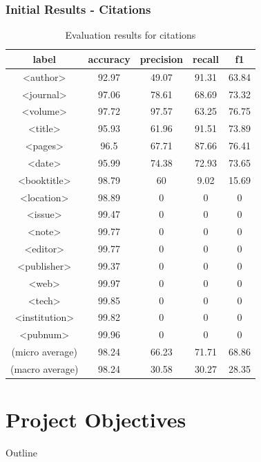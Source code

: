 \documentclass{beamer}
\begin{document}

\begin{frame}
\frametitle{Initial Results - Citations}

\begin{center}
\begingroup
\fontsize{8pt}{10pt}\selectfont

\begin{table}[h]
\begin{tabular}{ccccc}
\hline
label & accuracy & precision & recall & f1 \\
\hline
<author>	&92.97&49.07&91.31&63.84 \\
<journal>	&	97.06&		78.61	&	68.69	&	73.32\\
<volume>&		97.72&		97.57	&	63.25	&	76.75\\
<title>&		95.93	&	61.96	&	91.51	&	73.89\\
<pages>&		96.5		&67.71	&	87.66	&	76.41\\
<date>&		95.99	&	74.38	&	72.93	&	73.65\\
<booktitle>&		98.79	&	60	&	9.02	&	15.69\\
<location>&		98.89&		0	&	0	&	0\\
<issue>&		99.47	&	0	&	0	&	0\\
<note>&		99.77	&	0	&	0	&	0\\
<editor>&		99.77&		0	&	0	&	0\\
<publisher>&		99.37&		0	&	0	&	0\\
<web>&		99.97	&	0	&	0	&	0\\
<tech>&		99.85	&	0	&	0	&	0\\
<institution>&	99.82	&	0	&	0	&	0\\
<pubnum>&		99.96	&	0	&	0	&	0\\
\hline
(micro average) & 98.24	&	66.23&		71.71	&	68.86	\\
(macro average) & 98.24&		30.58&		30.27&		28.35	\\
\hline
\end{tabular}
\caption[Table caption text]{Evaluation results for citations}
\end{table}

\endgroup
\end{center}

\end{frame}


\section{Project Objectives}
\begin{frame}[noframenumbering]{Outline}
\tableofcontents[currentsection]
\end{frame}
\end{document}
